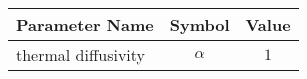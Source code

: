 \begin{tabular}{lcc}
\hline
 Parameter Name      &  Symbol  &  Value  \\
\hline
 thermal diffusivity & $\alpha$ &   $1$   \\
\hline
\end{tabular}